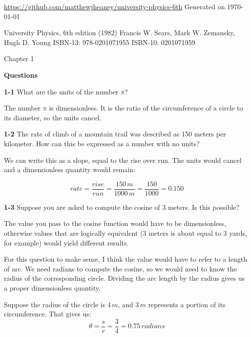 \documentclass{amsart}
\begin{document}

\begin{flushleft}
\url{https://github.com/matthewjheaney/university-physics-6th}\newline
Generated on \today
\end{flushleft}

\begin{flushleft}
University Physics, 6th edition (1982)\newline
Francis W. Sears, Mark W. Zemansky, Hugh D. Young\newline
ISBN-13: 978-0201071955\newline
ISBN-10: 0201071959\newline
\end{flushleft}

Chapter 1

\textbf{Questions}

\textbf{1-1} What are the units of the number $\pi$?

The number $\pi$ is dimensionless.  It is the ratio of the circumference of a circle to its diameter,
so the units cancel.

\textbf{1-2} The rate of climb of a mountain trail was described as 150 meters per kilometer.
How can this be expressed as a number with no units?

We can write this as a slope, equal to the rise over run.
The units would cancel and a dimensionless quantity would remain:

\[
  rate = \frac{rise}{run} = \frac{150 \, m}{1000 \, m} = \frac{150}{1000} = 0.150
\]

\textbf{1-3} Suppose you are asked to compute the cosine of 3 meters. Is this possible?

The value you pass to the cosine function would have to be dimensionless, otherwise values that are logically equivalent
(3 meters is about equal to 3 yards, for example) would yield different results.

For this question to make sense, I think the value would have to refer to a length of arc.
We need radians to compute the cosine, so we would need to know the radius of the corresponding circle.
Dividing the arc length by the radius gives us a proper dimensionless quantity.

Suppose the radius of the circle is $4 \, m$, and $3 \, m$ represents a portion of its circumference.  That gives us:
\[
   \theta = \frac{s}{r} = \frac{3}{4} = 0.75 \, radians
\]
\end{document}
